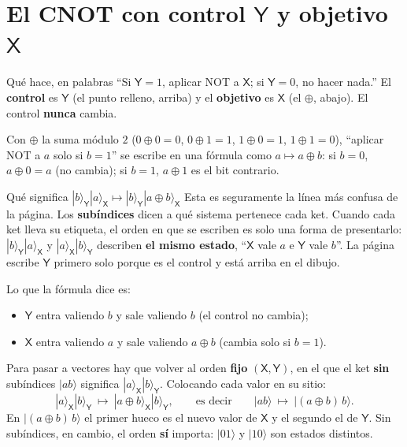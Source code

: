 \documentclass[11pt, a4paper, twoside, openright]{report}
\providecommand{\ket}[1]{|#1\rangle}
\newcommand{\X}{\mathsf{X}}
\newcommand{\Y}{\mathsf{Y}}
\begin{document}
\cleardoublepage
\section{El CNOT con control $\Y$ y objetivo $\X$}\label{sec:cnot}

\begin{teoria}{Qué hace, en palabras}
``Si $\Y=1$, aplicar NOT a $\X$; si $\Y=0$, no hacer nada.'' El \textbf{control} es $\Y$ (el punto relleno, arriba) y el \textbf{objetivo} es $\X$ (el $\oplus$, abajo). El control \textbf{nunca} cambia.

Con $\oplus$ la suma módulo $2$ ($0\oplus0=0$, $0\oplus1=1$, $1\oplus0=1$, $1\oplus1=0$), ``aplicar NOT a $a$ solo si $b=1$'' se escribe en una fórmula como $a\mapsto a\oplus b$: si $b=0$, $a\oplus0=a$ (no cambia); si $b=1$, $a\oplus1$ es el bit contrario.
\end{teoria}

\begin{aclaracion}{Qué significa $\ket{b}_\Y\ket{a}_\X\mapsto\ket{b}_\Y\ket{a\oplus b}_\X$}
Esta es seguramente la línea más confusa de la página. Los \textbf{subíndices} dicen a qué sistema pertenece cada ket. Cuando cada ket lleva su etiqueta, el orden en que se escriben es solo una forma de presentarlo: $\ket{b}_\Y\ket{a}_\X$ y $\ket{a}_\X\ket{b}_\Y$ describen \textbf{el mismo estado}, ``$\X$ vale $a$ e $\Y$ vale $b$''. La página escribe $\Y$ primero solo porque es el control y está arriba en el dibujo.

Lo que la fórmula dice es:
\begin{itemize}
  \item $\Y$ entra valiendo $b$ y sale valiendo $b$ (el control no cambia);
  \item $\X$ entra valiendo $a$ y sale valiendo $a\oplus b$ (cambia solo si $b=1$).
\end{itemize}
Para pasar a vectores hay que volver al orden \textbf{fijo} $(\X,\Y)$, en el que el ket \textbf{sin} subíndices $\ket{ab}$ significa $\ket{a}_\X\ket{b}_\Y$. Colocando cada valor en su sitio:
\[
\ket{a}_\X\ket{b}_\Y\ \longmapsto\ \ket{a\oplus b}_\X\ket{b}_\Y,
\qquad\text{es decir}\qquad
\ket{ab}\ \longmapsto\ \ket{(a\oplus b)\,b}.
\]
En $\ket{(a\oplus b)\,b}$ el primer hueco es el nuevo valor de $\X$ y el segundo el de $\Y$. Sin subíndices, en cambio, el orden \textbf{sí} importa: $\ket{01}$ y $\ket{10}$ son estados distintos.
\end{aclaracion}
\end{document}
